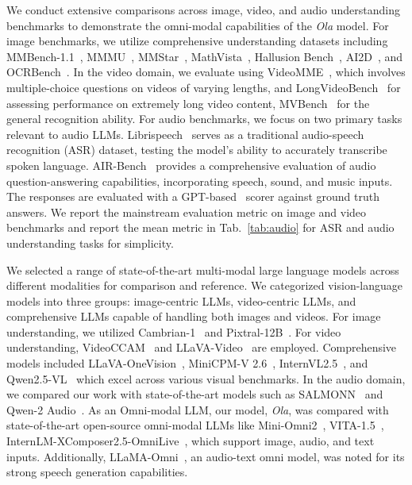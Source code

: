 We conduct extensive comparisons across image, video, and audio understanding benchmarks to demonstrate the omni-modal capabilities of the \textit{Ola} model. For image benchmarks, we utilize comprehensive understanding datasets including MMBench-1.1~\citep{liu2023mmbench}, MMMU~\citep{yue2024mmmu}, MMStar~\citep{chen2024mmstar}, MathVista~\citep{lu2023mathvista}, Hallusion Bench~\citep{guan2024hallusionbench}, AI2D~\citep{kembhavi2016ai2d}, and OCRBench~\citep{liu2023ocrbench}. In the video domain, we evaluate using VideoMME~\citep{fu2024videomme}, which involves multiple-choice questions on videos of varying lengths, and LongVideoBench~\citep{wu2024longvideobench} for assessing performance on extremely long video content, MVBench~\citep{li2024mvbench} for the general recognition ability. For audio benchmarks, we focus on two primary tasks relevant to audio LLMs. Librispeech~\citep{panayotov2015librispeech} serves as a traditional audio-speech recognition (ASR) dataset, testing the model's ability to accurately transcribe spoken language. AIR-Bench~\citep{yang2024airbench} provides a comprehensive evaluation of audio question-answering capabilities, incorporating speech, sound, and music inputs. The responses are evaluated with a GPT-based~\citep{OpenAI_GPT4_2023} scorer against ground truth answers. We report the mainstream evaluation metric on image and video benchmarks and report the mean metric in Tab.~\ref{tab:audio} for ASR and audio understanding tasks for simplicity. 

We selected a range of state-of-the-art multi-modal large language models across different modalities for comparison and reference. We categorized vision-language models into three groups: image-centric LLMs, video-centric LLMs, and comprehensive LLMs capable of handling both images and videos.  For image understanding, we utilized Cambrian-1~\citep{tong2024cambrian} and Pixtral-12B~\citep{agrawal2024pixtral}.  For video understanding, VideoCCAM~\citep{fei2024videoccam} and LLaVA-Video~\citep{zhang2024videoinstructiontuningsynthetic} are employed. Comprehensive models included LLaVA-OneVision~\citep{li2024llavaov}, MiniCPM-V 2.6~\citep{yao2024minicpm}, InternVL2.5~\citep{chen2024intern25}, and Qwen2.5-VL~\citep{Qwen2.5-VL} which excel across various visual benchmarks. In the audio domain, we compared our work with state-of-the-art models such as SALMONN~\citep{tang2023salmonn} and Qwen-2 Audio~\citep{chu2024qwen2audio}. As an Omni-modal LLM, our model, \textit{Ola}, was compared with state-of-the-art open-source omni-modal LLMs like Mini-Omni2~\citep{xie2024miniomni2}, VITA-1.5~\citep{fu2024vita}, InternLM-XComposer2.5-OmniLive~\citep{internlmxcomposer2_5_OL}, which support image, audio, and text inputs.  Additionally, LLaMA-Omni~\citep{xie2024miniomni2}, an audio-text omni model, was noted for its strong speech generation capabilities.




